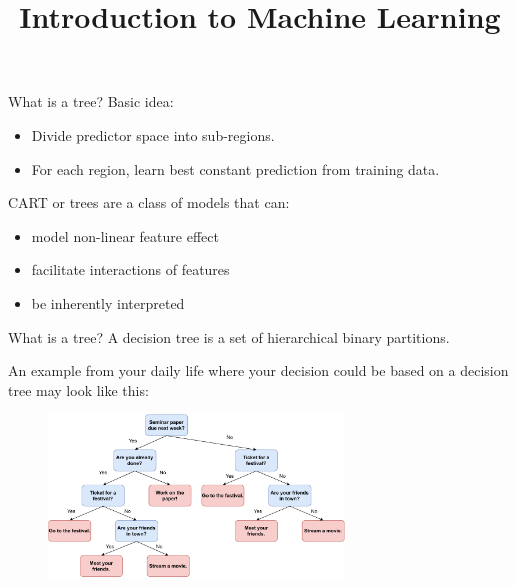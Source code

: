 \documentclass[11pt,compress,t,notes=noshow, xcolor=table]{beamer}
\title{Introduction to Machine Learning}
\institute{\href{https://compstat-lmu.github.io/lecture_i2ml/}{compstat-lmu.github.io/lecture\_i2ml}}
\date{}
\begin{document}
\sloppy

\begin{vbframe}{What is a tree?}
Basic idea: 
\begin{itemize}
\item Divide predictor space into sub-regions.%
\item For each region, learn best constant prediction from  training data. %
\end{itemize}

\vspace{0.5cm}

    CART or trees are a class of models that can:
  \begin{itemize}
    \item model non-linear feature effect
    \item facilitate interactions of features
    \item be inherently interpreted
  \end{itemize}
\end{vbframe}

\begin{vbframe}{What is a tree?}
A decision tree is a set of hierarchical binary partitions.

An example from your daily life where your decision could be based on a decision tree may look like this:

  \begin{figure}
    \centering
\includegraphics[width=0.7\textwidth, keepaspectratio]{figure/nutshell-example.pdf}
    \end{figure}

\end{vbframe}
\end{document}
